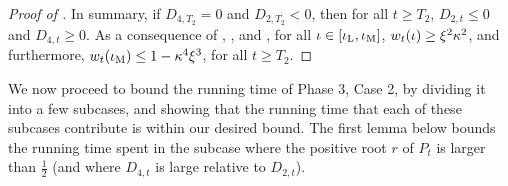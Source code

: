 \begin{proof}[Proof of ]
In summary, if $D_{4, T_2} = 0$ and $D_{2, T_2} < 0$, then for all $t \geq T_2$, $D_{2, t} \leq 0$ and $D_{4, t} \geq 0$. As a consequence of , , and , for all $\iota \in [\iota_{\textup{L}}, \iota_{\textup{M}}]$, $w_t(\iota) \geq \xi^2 \kappa^2$, and furthermore, $w_t(\iota_{\textup{M}}) \leq 1 - \kappa^4 \xi^3$, for all $t \geq T_2$.
\end{proof}

We now proceed to bound the running time of Phase 3, Case 2, by dividing it into a few subcases, and showing that the running time that each of these subcases contribute is within our desired bound. The first lemma below bounds the running time spent in the subcase where the positive root $r$ of $P_t$ is larger than $\frac{1}{2}$ (and where $D_{4, t}$ is large relative to $D_{2, t}$).

